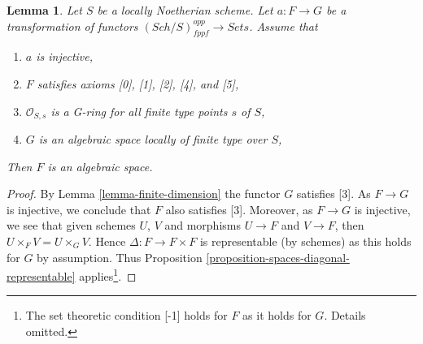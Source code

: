 \documentclass[10pt,a4paper]{amsart}
\theoremstyle{plain}
\newtheorem{lemma}[subsection]{Lemma}
\theoremstyle{definition}
\theoremstyle{remark}
\numberwithin{equation}{subsection}
\def\Sch{\mathit{Sch}}
\begin{document}
\begin{lemma}
\label{lemma-monomorphism}
Let $S$ be a locally Noetherian scheme. Let $a : F \to G$ be a transformation
of functors $(\Sch/S)_{fppf}^{opp} \to \textit{Sets}$.
Assume that
\begin{enumerate}
\item $a$ is injective,
\item $F$ satisfies axioms [0], [1], [2], [4], and [5],
\item $\mathcal{O}_{S, s}$ is a G-ring for all finite type points $s$ of $S$,
\item $G$ is an algebraic space locally of finite type over $S$,
\end{enumerate}
Then $F$ is an algebraic space.
\end{lemma}

\begin{proof}
By Lemma \ref{lemma-finite-dimension} the functor $G$ satisfies [3].
As $F \to G$ is injective, we conclude that $F$ also satisfies [3].
Moreover, as $F \to G$ is injective, we see that given schemes
$U$, $V$ and morphisms $U \to F$ and $V \to F$, then
$U \times_F V = U \times_G V$. Hence $\Delta : F \to F \times F$ is
representable (by schemes) as this holds for $G$ by assumption.
Thus Proposition \ref{proposition-spaces-diagonal-representable}
applies\footnote{The set
theoretic condition [-1] holds for $F$ as it holds for $G$. Details
omitted.}.
\end{proof}
\end{document}
